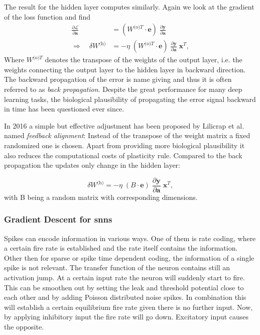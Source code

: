 The result for the hidden layer computes similarly. Again we look at the gradient of the loss function and find
\begin{align}
\frac{\partial\mathcal{L}}{\partial \mathbf{a}} &= \left(W^{\text{(o)}T} \cdot \mathbf{e}\right) \;
\frac{\partial \mathbf{y} }{\partial \mathbf{a}}\\
\Rightarrow \quad \delta W^{\text{(h)}} &= - \eta \;
\left(W^{\text{(o)}T} \cdot \mathbf{e}\right) \;
\frac{\partial \mathbf{y} }{\partial \mathbf{a}} \;
\mathbf{x}^T,
\end{align}
Where $W^{\text{(o)}T}$ denotes the transpose of the weights of the output layer, i.e. the weights connecting the output layer to the hidden layer in backward direction. The backward propagation of the error is name giving and thus it is often referred to as \textit{back propagation}. Despite the great performance for many deep learning tasks, the biological plausibility of propagating the error signal backward in time has been questioned ever since. 

In 2016 a simple but effective adjustment has been proposed by Lilicrap et al. named \textit{feedback alignment}: Instead of the transpose of the weight matrix a fixed randomized one is chosen. Apart from providing more biological plausibility it also reduces the computational costs of plasticity rule. Compared to the back propagation the updates only change in the hidden layer:

\begin{equation}
\delta W^{\text{(h)}} = - \eta \;
(B \cdot \mathbf{e}) \;
\frac{\partial \mathbf{y}}{\partial \mathbf{a}} \;
\mathbf{x}^T,
\end{equation}
with B being a random matrix with corresponding dimensions.

\subsubsection{Gradient Descent for \glspl{snn}}

Spikes can encode information in various ways. One of them is rate coding, where a certain fire rate is established and the rate itself contains the information. Other then for sparse or spike time dependent coding, the information of a single spike is not relevant. The transfer function of the neuron contains still an activation jump. At a certain input rate the neuron will suddenly start to fire. This can be smoothen out by setting the leak and threshold potential close to each other and by adding Poisson distributed noise spikes. In combination this will establish a certain equilibrium fire rate given there is no further input. Now, by applying inhibitory input the fire rate will go down. Excitatory input causes the opposite.

